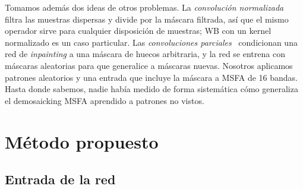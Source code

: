 \documentclass{article}
\begin{document}
Tomamos además dos ideas de otros problemas. La \emph{convolución
normalizada}~\cite{knutsson1993} filtra las muestras dispersas y divide por
la máscara filtrada, así que el mismo operador sirve para cualquier
disposición de muestras; WB con un kernel normalizado es un caso particular.
Las \emph{convoluciones parciales}~\cite{liu2018} condicionan una red de
\emph{inpainting} a una máscara de huecos arbitraria, y la red se entrena con
máscaras aleatorias para que generalice a máscaras nuevas. Nosotros
aplicamos patrones aleatorios y una entrada que incluye la máscara a MSFA de
16 bandas. Hasta donde sabemos, nadie había medido de forma sistemática cómo
generaliza el demosaicking MSFA aprendido a patrones no vistos.

\section{Método propuesto}
\label{sec:method}

\subsection{Entrada de la red}
\end{document}
